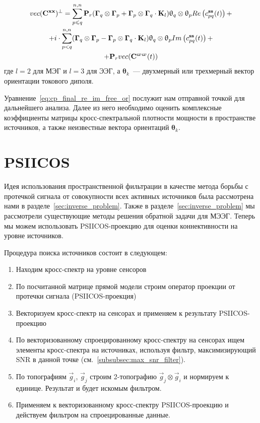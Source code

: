 \begin{multline}
    vec(\mathbf{C}^{\mathbf{x x}})^\perp = \sum\limits_{p\leqslant q}^{n,n}
    \mathbf{P}_r(\mathbf{\Gamma}_q\otimes \mathbf{\Gamma}_p +
                 \mathbf{\Gamma}_p\otimes \mathbf{\Gamma}_q\cdot \mathbf{K}_l)
                 \mathbf{\uptheta}_q \otimes \mathbf{\uptheta}_p
           Re\left(c_{pq}^{\mathbf{ss}}(t)\right) + \\
       +    i \cdot \sum\limits_{p<q}^{n,n}
           (\mathbf{\Gamma}_q\otimes \mathbf{\Gamma}_p -
            \mathbf{\Gamma}_p\otimes \mathbf{\Gamma}_q\cdot \mathbf{K}_l)
            \mathbf{\uptheta}_q \otimes \mathbf{\uptheta}_p
           Im\left(c_{pq}^{\mathbf{ss}}(t)\right) + \\
       +   \mathbf{P}_r vec(\mathbf{C}^{\mathbf{\upomega \upomega}}(t))
    \label{eq:cp_final_re_im_free_or}
\end{multline}
где $l=2$ для МЭГ и $l=3$ для ЭЭГ, а $\mathbf{\theta}_k$~--- двухмерный или трехмерный вектор ориентации токового диполя.

Уравнение~\ref{eq:cp_final_re_im_free_or} послужит нам отправной точкой для дальнейшего анализа.
Далее из него необходимо оценить комплексные коэффициенты матрицы кросс-спектральной плотности мощности в
пространстве источников, а также неизвестные вектора ориентаций $\mathbf{\theta}_k$.

\section{PSIICOS}\label{sec:psiicos}
Идея использования пространственной фильтрации в качестве метода борьбы с
протечкой сигнала от совокупности всех активных источников была рассмотрена
нами в разделе~\ref{sec:inverse_problem}.
Также в разделе~\ref{sec:inverse_problem} мы рассмотрели существующие методы решения
обратной задачи для МЭЭГ.
Теперь мы можем использовать PSIICOS-проекцию для оценки
коннективности на уровне источников.

Процедура поиска источников состоит в следующем:
\begin{enumerate}
    \item Находим кросс-спектр на уровне сенсоров
    \item По посчитанной матрице прямой модели строим оператор проекции от протечки сигнала (PSIICOS-проекция)
    \item Векторизуем кросс-спектр на сенсорах и применяем к результату PSIICOS-проекцию
    \item По векторизованному спроецированному кросс-спектру на сенсорах ищем элементы кросс-спектра на
        источниках, используя фильтр, максимизирующий SNR в данной точке (см.~\ref{subsubsec:max_snr_filter}).
    \item По топографиям $\vec{g}_i$, $\vec{g}_j$
        строим 2-топографию $\vec{g}_j \otimes \vec{g}_i$ и нормируем к единице.
        Результат и будет искомым фильтром.
    \item Применяем к векторизованному кросс-спектру PSIICOS-проекцию
        и действуем фильтром на спроецированные данные.
\end{enumerate}

